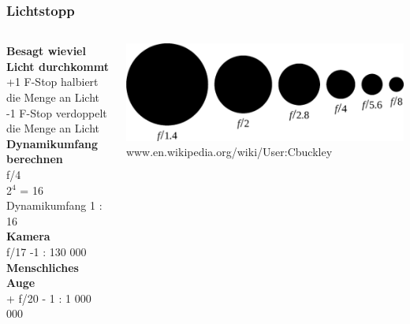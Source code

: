 \documentclass{beamer}
\begin{document}
	\begin{frame}
	\frametitle{Lichtstopp}
	\begin{columns}
		\begin{column}{0.55\textwidth}
			\textbf{Besagt wieviel Licht durchkommt} \\
			\small \hspace{2mm} +1 F-Stop halbiert die Menge an Licht\\
			\small \hspace{2mm} -1 F-Stop verdoppelt die Menge an Licht\\
			\vspace{5mm}
			\textbf{Dynamikumfang berechnen} \\
			\indent
			\small \hspace{2mm} f/4\\
			\small \hspace{2mm} 2$^{4}$ = 16\\
			\small \hspace{2mm} Dynamikumfang 1 : 16\\
			\vspace{5mm}
			\textbf{Kamera} \\
			\small \hspace{2mm} f/17 -1 : 130 000\\
			\vspace{5mm}
			\textbf{Menschliches Auge} \\
			\small \hspace{2mm} + f/20 - 1 : 1 000 000\\
		\end{column}
		\begin{column}{0.45\textwidth}
			\includegraphics[scale=0.35]{img/bild3.png}
			\tiny www.en.wikipedia.org/wiki/User:Cbuckley
		\end{column}
	\end{columns}
	\end{frame}
\end{document}
